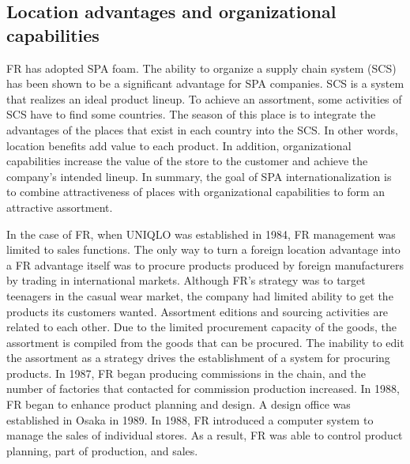 \documentclass[12pt,a4paper]{article}
\begin{document}
\hypertarget{location-advantages-and-organizational-capabilities}{%
\subsection{Location advantages and organizational
capabilities}\label{location-advantages-and-organizational-capabilities}}

FR has adopted SPA foam. The ability to organize a supply chain system
(SCS) has been shown to be a significant advantage for SPA companies.
SCS is a system that realizes an ideal product lineup. To achieve an
assortment, some activities of SCS have to find some countries. The
season of this place is to integrate the advantages of the places that
exist in each country into the SCS. In other words, location benefits
add value to each product. In addition, organizational capabilities
increase the value of the store to the customer and achieve the
company's intended lineup. In summary, the goal of SPA
internationalization is to combine attractiveness of places with
organizational capabilities to form an attractive assortment.

In the case of FR, when UNIQLO was established in 1984, FR management
was limited to sales functions. The only way to turn a foreign location
advantage into a FR advantage itself was to procure products produced by
foreign manufacturers by trading in international markets. Although FR's
strategy was to target teenagers in the casual wear market, the company
had limited ability to get the products its customers wanted. Assortment
editions and sourcing activities are related to each other. Due to the
limited procurement capacity of the goods, the assortment is compiled
from the goods that can be procured. The inability to edit the
assortment as a strategy drives the establishment of a system for
procuring products. In 1987, FR began producing commissions in the
chain, and the number of factories that contacted for commission
production increased. In 1988, FR began to enhance product planning and
design. A design office was established in Osaka in 1989. In 1988, FR
introduced a computer system to manage the sales of individual stores.
As a result, FR was able to control product planning, part of
production, and sales.
\end{document}
